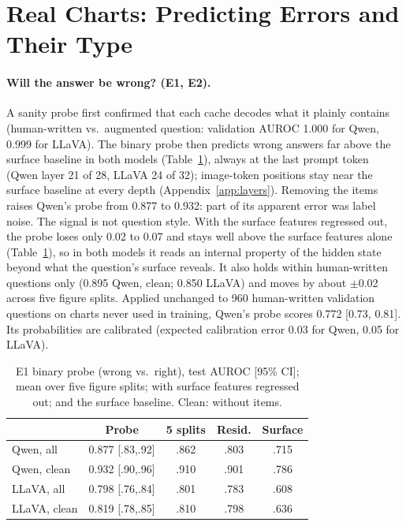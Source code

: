\section{Real Charts: Predicting Errors and Their Type}
\label{sec:chartqa}

\paragraph{Will the answer be wrong? (E1, E2).} A sanity probe first confirmed
that each cache decodes what it plainly contains (human-written vs.\ augmented
question: validation AUROC 1.000 for Qwen, 0.999 for LLaVA). The binary probe
then predicts wrong answers far above the surface baseline in both models
(Table~\ref{tab:e1}), always at the last prompt token (Qwen layer 21 of 28,
LLaVA 24 of 32); image-token positions stay near the surface baseline at every
depth (Appendix~\ref{app:layers}). Removing the  items raises
Qwen's probe from 0.877 to 0.932: part of its apparent error was label noise.
The signal is not question style. With the surface features regressed out, the
probe loses only 0.02 to 0.07 and stays well above the surface features alone
(Table~\ref{tab:e1}), so in both models it reads an internal property of the
hidden state beyond what the question's surface reveals. It also holds within
human-written questions only (0.895 Qwen, clean; 0.850 LLaVA) and moves by about
$\pm$0.02 across five figure splits.
Applied unchanged to 960 human-written validation questions on charts never
used in training, Qwen's probe scores 0.772 [0.73, 0.81]. Its probabilities are
calibrated (expected calibration error 0.03 for Qwen, 0.05 for LLaVA).

\begin{table}[t]
\centering\small\setlength{\tabcolsep}{3pt}
\begin{tabular}{lcccc}
\toprule
 & Probe & 5 splits & Resid. & Surface \\
\midrule
Qwen, all & 0.877 {\scriptsize[.83,.92]} & .862 & .803 & .715 \\
Qwen, clean & 0.932 {\scriptsize[.90,.96]} & .910 & .901 & .786 \\
LLaVA, all & 0.798 {\scriptsize[.76,.84]} & .801 & .783 & .608 \\
LLaVA, clean & 0.819 {\scriptsize[.78,.85]} & .810 & .798 & .636 \\
\bottomrule
\end{tabular}
\caption{E1 binary probe (wrong vs.\ right), test AUROC [95\% CI]; mean over five
figure splits; with surface features regressed out; and the surface baseline.
Clean: without  items.}
\label{tab:e1}
\end{table}

